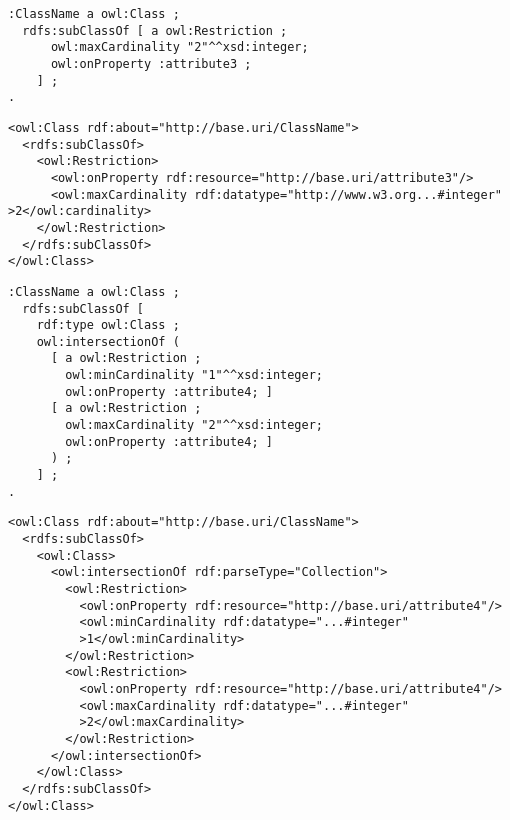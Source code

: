 \vspace{-\parskip}
\begin{minipage}[b]{.385\textwidth}
\begin{lstlisting}[language=Turtle, caption={Max cardinality restriction in Turtle syntax}, captionpos=b]
:ClassName a owl:Class ;
  rdfs:subClassOf [ a owl:Restriction ;
      owl:maxCardinality "2"^^xsd:integer;
      owl:onProperty :attribute3 ;
    ] ;
.
\end{lstlisting}
\end{minipage}%
\quad\vspace{-\parskip}
\begin{minipage}[b]{.6\textwidth}
\begin{lstlisting}[language=RDF/XML, caption={Max cardinality restriction in RDF/XML syntax}, captionpos=b]
<owl:Class rdf:about="http://base.uri/ClassName">
  <rdfs:subClassOf>
    <owl:Restriction>
      <owl:onProperty rdf:resource="http://base.uri/attribute3"/>
      <owl:maxCardinality rdf:datatype="http://www.w3.org...#integer" >2</owl:cardinality>
    </owl:Restriction>
  </rdfs:subClassOf>
</owl:Class>
\end{lstlisting}
\end{minipage}
\vspace{-\parskip}

\vspace{-\parskip}
\begin{minipage}[b]{.385\textwidth}
\begin{lstlisting}[language=Turtle, caption={Min and max cardinality restriction in Turtle syntax}, captionpos=b]
:ClassName a owl:Class ;
  rdfs:subClassOf [
    rdf:type owl:Class ;
    owl:intersectionOf (
      [ a owl:Restriction ;
        owl:minCardinality "1"^^xsd:integer;
        owl:onProperty :attribute4; ]
      [ a owl:Restriction ;
        owl:maxCardinality "2"^^xsd:integer;
        owl:onProperty :attribute4; ]
      ) ;
    ] ;
.        
\end{lstlisting}
\end{minipage}%
\quad
\vspace{-\parskip}
\begin{minipage}[b]{.6\textwidth}
\begin{lstlisting}[language=RDF/XML, caption={Min and max cardinality restriction in RDF/XML syntax}, captionpos=b]
<owl:Class rdf:about="http://base.uri/ClassName">
  <rdfs:subClassOf>
    <owl:Class>
      <owl:intersectionOf rdf:parseType="Collection">
        <owl:Restriction>
          <owl:onProperty rdf:resource="http://base.uri/attribute4"/>
          <owl:minCardinality rdf:datatype="...#integer"
          >1</owl:minCardinality>
        </owl:Restriction>
        <owl:Restriction>
          <owl:onProperty rdf:resource="http://base.uri/attribute4"/>
          <owl:maxCardinality rdf:datatype="...#integer"
          >2</owl:maxCardinality>
        </owl:Restriction>
      </owl:intersectionOf>
    </owl:Class>
  </rdfs:subClassOf>
</owl:Class>
\end{lstlisting}
\end{minipage}
\vspace{-\parskip}

